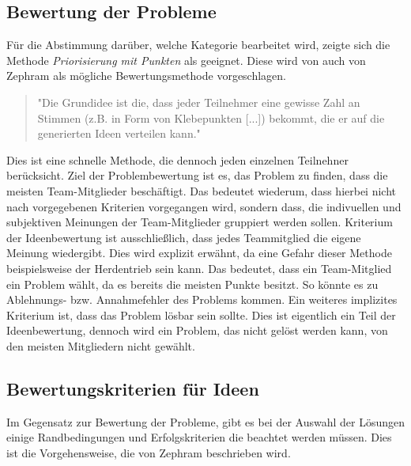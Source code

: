 \subsection{Bewertung der Probleme}\label{sec:retro-punkte}
Für die Abstimmung darüber, welche Kategorie bearbeitet wird, zeigte sich die Methode \textit{Priorisierung mit Punkten} 
als geeignet. Diese wird von auch von Zephram als mögliche Bewertungsmethode vorgeschlagen.
\begin{quote}
    "Die Grundidee ist die, dass jeder Teilnehmer eine gewisse Zahl an Stimmen (z.B. in Form von Klebepunkten [...]) bekommt, die er auf die generierten Ideen verteilen kann." \cite{dotmocracy:2011}
\end{quote} 
Dies ist eine schnelle Methode, die dennoch jeden einzelnen Teilnehner berücksicht. Ziel der Problembewertung ist es, das Problem zu 
finden, dass die meisten Team-Mitglieder beschäftigt. Das bedeutet wiederum, dass hierbei nicht nach vorgegebenen Kriterien 
vorgegangen wird, sondern dass, die indivuellen und subjektiven Meinungen der Team-Mitglieder gruppiert werden sollen. 
Kriterium der Ideenbewertung ist ausschließlich, dass jedes Teammitglied die eigene Meinung wiedergibt. Dies wird explizit erwähnt, 
da eine Gefahr dieser Methode beispielsweise der Herdentrieb sein kann. Das bedeutet, dass ein Team-Mitglied 
ein Problem wählt, da es bereits die meisten Punkte besitzt. So könnte es zu Ablehnungs- bzw. Annahmefehler des Problems kommen. \cite{derby:2012}
Ein weiteres implizites Kriterium ist, dass das Problem lösbar sein sollte. Dies ist eigentlich ein Teil der Ideenbewertung, 
dennoch wird ein Problem, das nicht gelöst werden kann, von den meisten Mitgliedern nicht gewählt. 

\subsection{Bewertungskriterien für Ideen}\label{sec:retro-kriterien}
Im Gegensatz zur Bewertung der Probleme, gibt es bei der Auswahl der Lösungen einige Randbedingungen
und Erfolgskriterien die beachtet werden müssen. Dies ist die Vorgehensweise, die von Zephram beschrieben wird.

